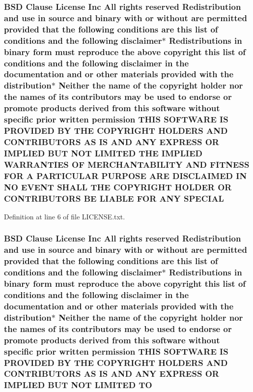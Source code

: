 \subsubsection[{\texorpdfstring{S\+P\+E\+C\+I\+AL}{SPECIAL}}]{\setlength{\rightskip}{0pt plus 5cm}B\+SD Clause License Inc All rights reserved Redistribution and use in source and binary with or without are permitted provided that the following conditions are this list of conditions and the following disclaimer$\ast$ Redistributions in binary form must reproduce the above copyright this list of conditions and the following disclaimer in the documentation and or other materials provided with the distribution$\ast$ Neither the name of the copyright holder nor the names of its contributors may be used to endorse or promote products derived from this software without specific prior written permission T\+H\+IS S\+O\+F\+T\+W\+A\+RE IS P\+R\+O\+V\+I\+D\+ED BY T\+HE C\+O\+P\+Y\+R\+I\+G\+HT H\+O\+L\+D\+E\+RS A\+ND C\+O\+N\+T\+R\+I\+B\+U\+T\+O\+RS AS IS A\+ND A\+NY E\+X\+P\+R\+E\+SS OR I\+M\+P\+L\+I\+ED B\+UT N\+OT L\+I\+M\+I\+T\+ED T\+HE I\+M\+P\+L\+I\+ED {\bf W\+A\+R\+R\+A\+N\+T\+I\+ES} OF M\+E\+R\+C\+H\+A\+N\+T\+A\+B\+I\+L\+I\+TY A\+ND F\+I\+T\+N\+E\+SS F\+OR A P\+A\+R\+T\+I\+C\+U\+L\+AR P\+U\+R\+P\+O\+SE A\+RE D\+I\+S\+C\+L\+A\+I\+M\+ED IN NO E\+V\+E\+NT S\+H\+A\+LL T\+HE C\+O\+P\+Y\+R\+I\+G\+HT H\+O\+L\+D\+ER OR C\+O\+N\+T\+R\+I\+B\+U\+T\+O\+RS BE L\+I\+A\+B\+LE F\+OR A\+NY S\+P\+E\+C\+I\+AL}\hypertarget{LICENSE_8txt_af45db6de18a60188d90a1c28a9cbb207}{}\label{LICENSE_8txt_af45db6de18a60188d90a1c28a9cbb207}


Definition at line 6 of file L\+I\+C\+E\+N\+S\+E.\+txt.

\subsubsection[{\texorpdfstring{TO}{TO}}]{\setlength{\rightskip}{0pt plus 5cm}B\+SD Clause License Inc All rights reserved Redistribution and use in source and binary with or without are permitted provided that the following conditions are this list of conditions and the following disclaimer$\ast$ Redistributions in binary form must reproduce the above copyright this list of conditions and the following disclaimer in the documentation and or other materials provided with the distribution$\ast$ Neither the name of the copyright holder nor the names of its contributors may be used to endorse or promote products derived from this software without specific prior written permission T\+H\+IS S\+O\+F\+T\+W\+A\+RE IS P\+R\+O\+V\+I\+D\+ED BY T\+HE C\+O\+P\+Y\+R\+I\+G\+HT H\+O\+L\+D\+E\+RS A\+ND C\+O\+N\+T\+R\+I\+B\+U\+T\+O\+RS AS IS A\+ND A\+NY E\+X\+P\+R\+E\+SS OR I\+M\+P\+L\+I\+ED B\+UT N\+OT L\+I\+M\+I\+T\+ED TO}\hypertarget{LICENSE_8txt_a2c6391e9fede2624d7b114e2961298af}{}\label{LICENSE_8txt_a2c6391e9fede2624d7b114e2961298af}


